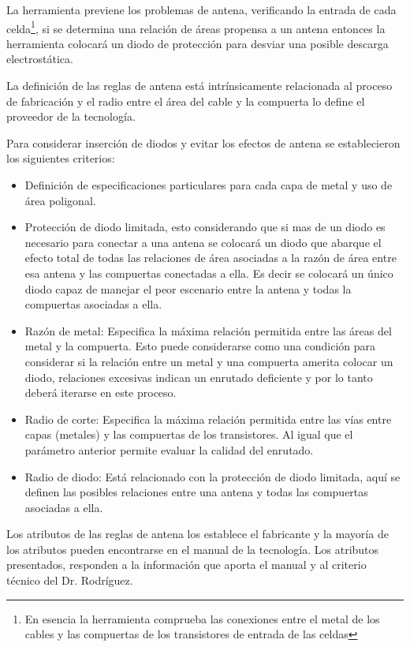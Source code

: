 La herramienta previene los problemas de antena, verificando la entrada de cada celda\footnote{En esencia la herramienta comprueba las conexiones entre el metal de los cables y las compuertas de los transistores de entrada de las celdas}, si se determina una relación  de áreas propensa a un antena entonces la herramienta colocará un diodo de protección para desviar una posible descarga electrostática.

La definición de las reglas de antena está intrínsicamente relacionada al proceso de fabricación y el radio entre el área del cable y la compuerta lo define el proveedor de la tecnología.

Para considerar inserción de diodos y evitar los efectos de antena se establecieron los siguientes criterios:

\begin{itemize}
\item Definición de especificaciones particulares para cada capa de metal y uso de área poligonal.
\item Protección de diodo limitada, esto considerando que si mas de un diodo es necesario para conectar a una antena se colocará un diodo que abarque el efecto total de todas las relaciones de área asociadas a la razón de área entre esa antena y las compuertas conectadas a ella. Es decir se colocará un único diodo capaz de manejar el peor escenario entre la antena y todas la compuertas asociadas a ella.
\item Razón de metal: Especifica la máxima relación permitida entre las áreas del metal y la compuerta. Esto puede considerarse como una condición para considerar si la relación entre un metal y una compuerta amerita colocar un diodo, relaciones excesivas indican un enrutado deficiente y por lo tanto deberá iterarse en este proceso.
\item Radio de corte: Especifica la máxima relación permitida entre las vías entre capas (metales) y las compuertas de los transistores. Al igual que el parámetro anterior permite evaluar la calidad del enrutado.
\item Radio de diodo: Está relacionado con la protección de diodo limitada, aquí se definen las posibles relaciones entre una antena y todas las compuertas asociadas a ella.
\end{itemize}

Los atributos de las reglas de antena los establece el fabricante y la mayoría de los atributos pueden encontrarse en el manual de la tecnología. Los atributos presentados, responden a la información que aporta el manual y al criterio técnico del Dr. Rodríguez.

